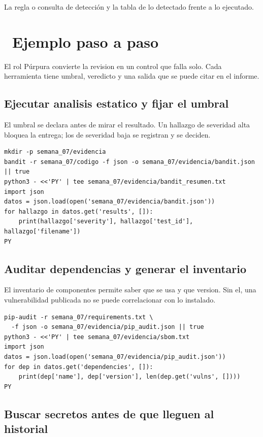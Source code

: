 \documentclass[11pt,a4paper]{article}
\newcommand{\iconotexto}[2]{\textcolor{cyanNeon}{\faIcon{#1}}~#2}
\begin{document}
La regla o consulta de detección y la tabla de lo detectado frente a lo ejecutado.

\section{\iconotexto{list-ol}{Ejemplo paso a paso}}

El rol Púrpura convierte la revision en un control que falla solo. Cada herramienta tiene umbral, veredicto y una salida que se puede citar en el informe.

\subsection{Ejecutar analisis estatico y fijar el umbral}

El umbral se declara antes de mirar el resultado. Un hallazgo de severidad alta bloquea la entrega; los de severidad baja se registran y se deciden.

\begin{lstlisting}[style=estiloCodigo]
mkdir -p semana_07/evidencia
bandit -r semana_07/codigo -f json -o semana_07/evidencia/bandit.json || true
python3 - <<'PY' | tee semana_07/evidencia/bandit_resumen.txt
import json
datos = json.load(open('semana_07/evidencia/bandit.json'))
for hallazgo in datos.get('results', []):
    print(hallazgo['severity'], hallazgo['test_id'], hallazgo['filename'])
PY
\end{lstlisting}

\subsection{Auditar dependencias y generar el inventario}

El inventario de componentes permite saber que se usa y que version. Sin el, una vulnerabilidad publicada no se puede correlacionar con lo instalado.

\begin{lstlisting}[style=estiloCodigo]
pip-audit -r semana_07/requirements.txt \
  -f json -o semana_07/evidencia/pip_audit.json || true
python3 - <<'PY' | tee semana_07/evidencia/sbom.txt
import json
datos = json.load(open('semana_07/evidencia/pip_audit.json'))
for dep in datos.get('dependencies', []):
    print(dep['name'], dep['version'], len(dep.get('vulns', [])))
PY
\end{lstlisting}

\subsection{Buscar secretos antes de que lleguen al historial}
\end{document}
